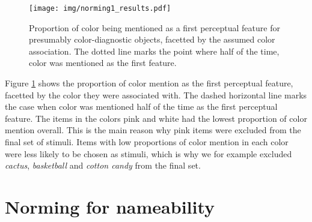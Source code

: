 \documentclass[a4paper,man,floatsintext,natbib,donotrepeattitle]{apa6}
\begin{document}
\begin{figure}
	\texttt{[image: img/norming1\_results.pdf]}
	\caption{Proportion of color being mentioned as a first perceptual feature for presumably color-diagnostic objects, facetted by the assumed color association. The dotted line marks the point where half of the time, color was mentioned as the first feature.}
	\label{fig:norming1results}
\end{figure}

Figure \ref{fig:norming1results} shows the proportion of color mention as the first perceptual feature, facetted by the color they were associated with. The dashed horizontal line marks the case when color was mentioned half of the time as the first perceptual feature. The items in the colors pink and white had the lowest proportion of color mention overall. This is the main reason why pink items were excluded from the final set of stimuli. Items with low proportions of color mention in each color were less likely to be chosen as stimuli, which is why we for example excluded \textit{cactus}, \textit{basketball} and \textit{cotton candy} from the final set. 


\section{Norming for nameability}
\label{nameabilitynorming}






\end{document}
